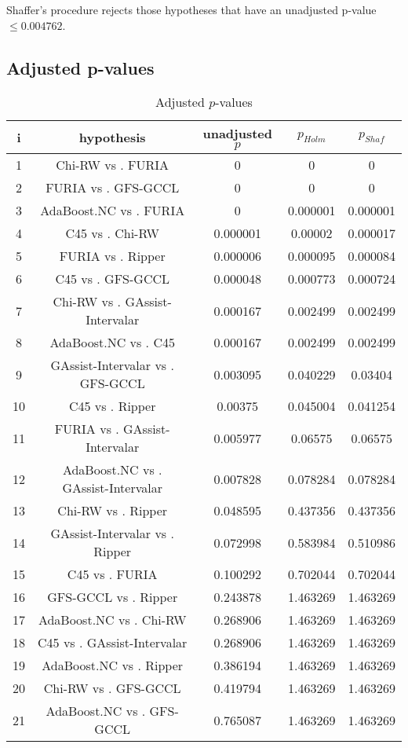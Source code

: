\documentclass[a4paper,10pt]{article}
\begin{document}
Shaffer's procedure rejects those hypotheses that have an unadjusted p-value $\le0.004762$.

\pagebreak

\subsection{Adjusted p-values}

\begin{table}[!htp]
\centering\scriptsize
\begin{tabular}{ccccc}
i&hypothesis&unadjusted $p$&$p_{Holm}$&$p_{Shaf}$\\
\hline1& Chi-RW  vs . FURIA &0&0&0\\
2& FURIA  vs . GFS-GCCL &0&0&0\\
3& AdaBoost.NC  vs . FURIA &0&0.000001&0.000001\\
4& C45  vs . Chi-RW &0.000001&0.00002&0.000017\\
5& FURIA  vs . Ripper&0.000006&0.000095&0.000084\\
6& C45  vs . GFS-GCCL &0.000048&0.000773&0.000724\\
7& Chi-RW  vs . GAssist-Intervalar &0.000167&0.002499&0.002499\\
8& AdaBoost.NC  vs . C45 &0.000167&0.002499&0.002499\\
9& GAssist-Intervalar  vs . GFS-GCCL &0.003095&0.040229&0.03404\\
10& C45  vs . Ripper&0.00375&0.045004&0.041254\\
11& FURIA  vs . GAssist-Intervalar &0.005977&0.06575&0.06575\\
12& AdaBoost.NC  vs . GAssist-Intervalar &0.007828&0.078284&0.078284\\
13& Chi-RW  vs . Ripper&0.048595&0.437356&0.437356\\
14& GAssist-Intervalar  vs . Ripper&0.072998&0.583984&0.510986\\
15& C45  vs . FURIA &0.100292&0.702044&0.702044\\
16& GFS-GCCL  vs . Ripper&0.243878&1.463269&1.463269\\
17& AdaBoost.NC  vs . Chi-RW &0.268906&1.463269&1.463269\\
18& C45  vs . GAssist-Intervalar &0.268906&1.463269&1.463269\\
19& AdaBoost.NC  vs . Ripper&0.386194&1.463269&1.463269\\
20& Chi-RW  vs . GFS-GCCL &0.419794&1.463269&1.463269\\
21& AdaBoost.NC  vs . GFS-GCCL &0.765087&1.463269&1.463269\\
\hline
\end{tabular}
\caption{Adjusted $p$-values}
\end{table}
\end{document}
